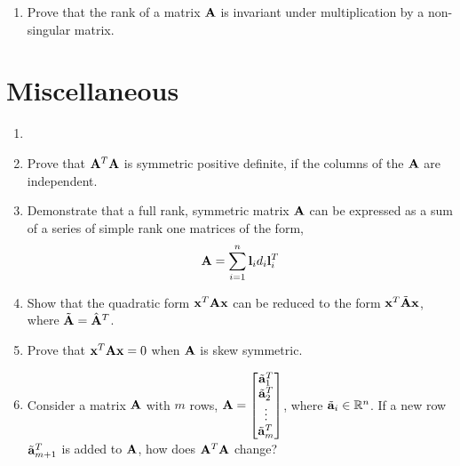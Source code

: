 \documentclass[9pt]{article}
\def\mf{\ensuremath\mathbf}
\begin{document}
\begin{multicols}{2}
\begin{enumerate}[resume]
    \item Prove that the rank of a matrix $\mf{A}$ is invariant under multiplication by a non-singular matrix.
\end{enumerate}

\section*{Miscellaneous}
\begin{enumerate}[resume]
    \item 

    \item Prove that $\mf{A}^T\mf{A}$ is symmetric positive definite, if the columns of the $\mf{A}$ are independent.

    \item Demonstrate that a full rank, symmetric matrix $\mf{A}$ can be expressed as a sum of a series of simple rank one matrices of the form,
    \[ \mf{A} = \sum_{i=1}^n\mf{l}_id_i\mf{l}_i^T \]

    \item Show that the quadratic form $\mf{x}^T\mf{A}\mf{x}$ can be reduced to the form $\mf{x}^T\tilde{\mf{A}}\mf{x}$, where $\tilde{\mf{A}} = \hat{\mf{A}}^T$.

    \item Prove that $\mf{x}^T\mf{A}\mf{x} = 0$ when $\mf{A}$ is skew symmetric.

    \item Consider a matrix $\mf{A}$ with $m$ rows, $\mf{A} = \begin{bmatrix*}\tilde{\mf{a}}_1^T\\\tilde{\mf{a}}_2^T\\\vdots\\\tilde{\mf{a}}_m^T\end{bmatrix*}$, where $\tilde{\mf{a}}_i \in \mathbb{R}^n$.
    If a new row $\tilde{\mf{a}}_{m+1}^T$ is added to $\mf{A}$, how does $\mf{A}^T\mf{A}$ change?
\end{enumerate}


\end{multicols}
\end{document}
